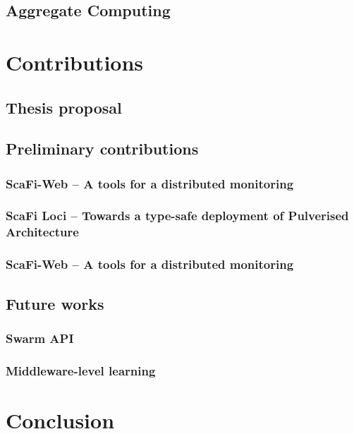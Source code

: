 \documentclass[11pt]{article}
\begin{document}
\subsection{Aggregate Computing}
\section{Contributions}
\subsection{Thesis proposal}
\subsection{Preliminary contributions}
\subsubsection{ScaFi-Web -- A tools for a distributed monitoring}
\subsubsection{ScaFi Loci -- Towards a type-safe deployment of Pulverised Architecture}
\subsubsection{ScaFi-Web -- A tools for a distributed monitoring}
\subsection{Future works}
\subsubsection{Swarm API}
\subsubsection{Middleware-level learning}
\section{Conclusion}
\nocite{*}


\end{document}
